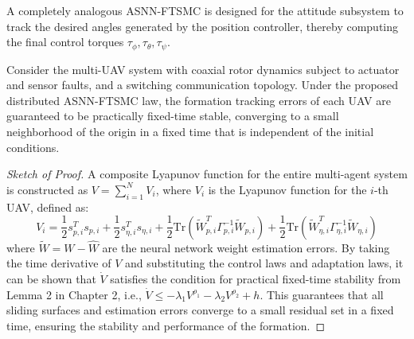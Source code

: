 A completely analogous ASNN-FTSMC is designed for the attitude subsystem to track the desired angles generated by the position controller, thereby computing the final control torques $\tau_\phi, \tau_\theta, \tau_\psi$.

\begin{theorem}
\label{thm:stability}
Consider the multi-UAV system with coaxial rotor dynamics subject to actuator and sensor faults, and a switching communication topology. Under the proposed distributed ASNN-FTSMC law, the formation tracking errors of each UAV are guaranteed to be practically fixed-time stable, converging to a small neighborhood of the origin in a fixed time that is independent of the initial conditions.
\end{theorem}

\begin{proof}[Sketch of Proof]
A composite Lyapunov function for the entire multi-agent system is constructed as $V = \sum_{i=1}^N V_i$, where $V_i$ is the Lyapunov function for the $i$-th UAV, defined as:
\begin{equation}
    V_i = \frac{1}{2}s_{p,i}^T s_{p,i} + \frac{1}{2}s_{\eta,i}^T s_{\eta,i} + \frac{1}{2}\text{Tr}(\tilde{W}_{p,i}^T \Gamma_{p,i}^{-1} \tilde{W}_{p,i}) + \frac{1}{2}\text{Tr}(\tilde{W}_{\eta,i}^T \Gamma_{\eta,i}^{-1} \tilde{W}_{\eta,i})
    \label{eq:lyapunov_function}
\end{equation}
where $\tilde{W} = W - \hat{W}$ are the neural network weight estimation errors. By taking the time derivative of $V$ and substituting the control laws and adaptation laws, it can be shown that $\dot{V}$ satisfies the condition for practical fixed-time stability from Lemma 2 in Chapter 2, i.e., $\dot{V} \le -\lambda_1 V^{\rho_1} - \lambda_2 V^{\rho_2} + h$. This guarantees that all sliding surfaces and estimation errors converge to a small residual set in a fixed time, ensuring the stability and performance of the formation.
\end{proof}
